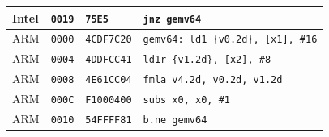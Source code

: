 \begin{table}[htbp]
\begin{tabular}{@{}l|l|l|p{7.2cm}@{}}
Intel & \texttt{0019} & \texttt{75E5} & \texttt{jnz gemv64} \\
\midrule
ARM & \texttt{0000} & \texttt{4CDF7C20} & \texttt{gemv64: ld1 \{v0.2d\}, [x1], \#16} \\
ARM & \texttt{0004} & \texttt{4DDFCC41} & \texttt{ld1r \{v1.2d\}, [x2], \#8} \\
ARM & \texttt{0008} & \texttt{4E61CC04} & \texttt{fmla v4.2d, v0.2d, v1.2d} \\
ARM & \texttt{000C} & \texttt{F1000400} & \texttt{subs x0, x0, \#1} \\
ARM & \texttt{0010} & \texttt{54FFFF81} & \texttt{b.ne gemv64} \\
\bottomrule
\end{tabular}
\endgroup
\end{table}
\noindent{}\par
